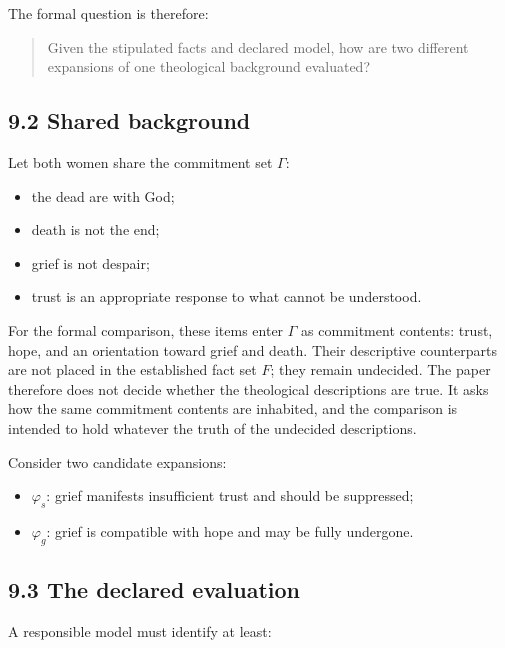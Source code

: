 \documentclass[
  11pt,
]{article}
\providecommand{\tightlist}{%
  \setlength{\itemsep}{0pt}\setlength{\parskip}{0pt}}
\begin{document}
The formal question is therefore:

\begin{quote}
Given the stipulated facts and declared model, how are two different
expansions of one theological background evaluated?
\end{quote}

\subsection{9.2 Shared background}\label{shared-background}

Let both women share the commitment set \(\Gamma\):

\begin{itemize}
\tightlist
\item
  the dead are with God;
\item
  death is not the end;
\item
  grief is not despair;
\item
  trust is an appropriate response to what cannot be understood.
\end{itemize}

For the formal comparison, these items enter \(\Gamma\) as commitment
contents: trust, hope, and an orientation toward grief and death. Their
descriptive counterparts are not placed in the established fact set
\(F\); they remain undecided. The paper therefore does not decide
whether the theological descriptions are true. It asks how the same
commitment contents are inhabited, and the comparison is intended to
hold whatever the truth of the undecided descriptions.

Consider two candidate expansions:

\begin{itemize}
\tightlist
\item
  \(\varphi_s\): grief manifests insufficient trust and should be
  suppressed;
\item
  \(\varphi_g\): grief is compatible with hope and may be fully
  undergone.
\end{itemize}

\subsection{9.3 The declared evaluation}\label{the-declared-evaluation}

A responsible model must identify at least:
\end{document}
